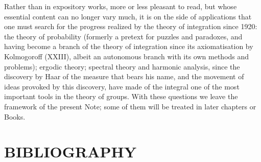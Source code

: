 Rather than in expository works, more or less pleasant to read, but whose essential content can no longer vary much, it is on the side of applications that one must search for the progress realized by the theory of integration since 1920: the theory of probability (formerly a pretext for puzzles and paradoxes, and having become a branch of the theory of integration since its axiomatisation by Kolmogoroff (XXIII), albeit an autonomous branch with its own methods and problems); ergodic theory; spectral theory and harmonic analysis, since the discovery by Haar of the measure that bears his name, and the movement of ideas provoked by this discovery, have made of the integral one of the most important tools in the theory of groups. With these questions we leave the framework of the present Note; some of them will be treated in later chapters or Books.

\chapter*{BIBLIOGRAPHY}
{}


